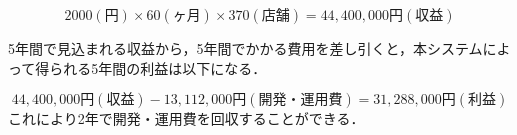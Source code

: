 \[2000(円)\times 60(ヶ月)\times 370(店舗)=44,400,000円(収益)\]


5年間で見込まれる収益から，5年間でかかる費用を差し引くと，本システムによって得られる5年間の利益は以下になる．

\[44,400,000円(収益)-13,112,000円(開発・運用費)=31,288,000円(利益)\]
これにより2年で開発・運用費を回収することができる．








